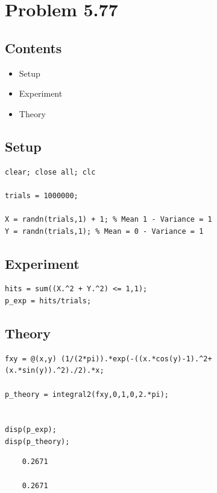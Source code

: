 \documentclass[12pt]{article}
\begin{document}
\section*{Problem 5.77}


\subsection*{Contents}

\begin{itemize}
\setlength{\itemsep}{-1ex}
   \item Setup
   \item Experiment
   \item Theory
\end{itemize}


\subsection*{Setup}

\begin{verbatim}
clear; close all; clc

trials = 1000000;

X = randn(trials,1) + 1; % Mean 1 - Variance = 1
Y = randn(trials,1); % Mean = 0 - Variance = 1
\end{verbatim}


\subsection*{Experiment}

\begin{verbatim}
hits = sum((X.^2 + Y.^2) <= 1,1);
p_exp = hits/trials;
\end{verbatim}


\subsection*{Theory}

\begin{verbatim}
fxy = @(x,y) (1/(2*pi)).*exp(-((x.*cos(y)-1).^2+(x.*sin(y)).^2)./2).*x;

p_theory = integral2(fxy,0,1,0,2.*pi);


disp(p_exp);
disp(p_theory);
\end{verbatim}

        \color{lightgray} \begin{verbatim}    0.2671

    0.2671

\end{verbatim} \color{black}
\end{document}
